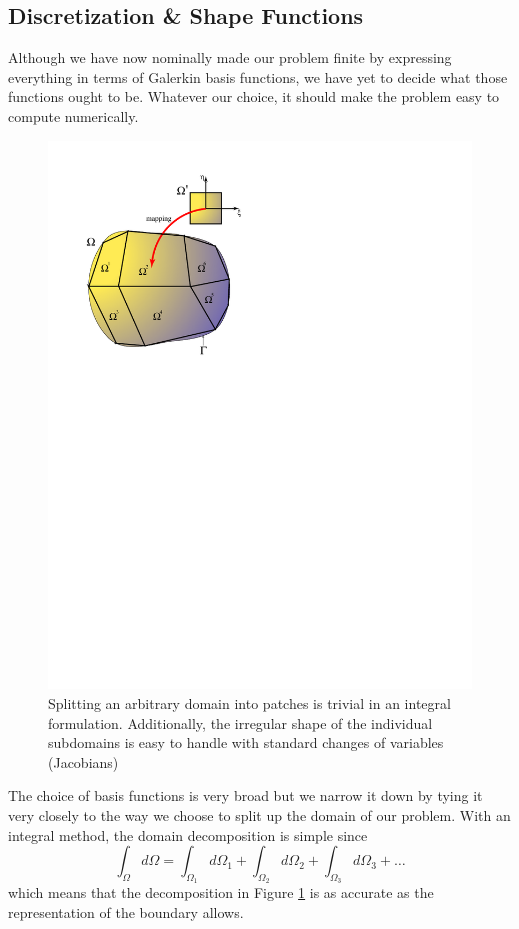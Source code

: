 \documentclass[10pt]{article}
\begin{document}
	\subsection{Discretization \& Shape Functions}
			
		Although we have now nominally made our problem finite by 
		expressing everything in terms of Galerkin basis functions, we have
		yet to decide what those functions ought to be. 
		Whatever our choice, it should make the problem easy to 
		compute numerically.
		
			\begin{figure}[h]           
				\begin{center}
		 			 \includegraphics[width=0.66\linewidth]{Diagrams/domain.pdf}
		 			\caption[]{Splitting an arbitrary domain into patches is trivial in an 
		 			integral formulation. Additionally, the irregular shape of the 
		 			individual subdomains is easy to handle with standard 
		 			changes of variables (Jacobians)}
		 			\label{fig:domain}
		 		\end{center}
			\end{figure}	
		
		The choice of basis functions is very broad but we narrow it down 
		by tying it very closely to the way we choose to split up the domain of our problem.
		With an integral method, the domain decomposition is simple since
			\begin{equation}
					\int_\Omega d\Omega = \int_{\Omega_1} d {\Omega_1} + \int_{\Omega_2} d {\Omega_2} + \int_{\Omega_3} d {\Omega_3} + \ldots
					\label{eq:decomp}
			\end{equation}
		which means that the decomposition in Figure \ref{fig:domain} is as accurate as the representation of 
		the boundary allows.  
		
\end{document}

